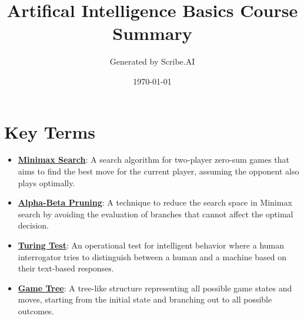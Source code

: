 \documentclass{article}%
\title{Artifical Intelligence Basics Course Summary}%
\author{Generated by Scribe.AI}%
\date{\today}%
\begin{document}
%
\normalsize%
\maketitle%
\section{Key Terms}%
\label{sec:KeyTerms}%
\begin{itemize}[leftmargin=*]%
\item \href{https://purdue.brightspace.com/d2l/common/assets/pdfjs-d2l-dist/1.0.14-legacy/web/viewer.html?file=\%2Fcontent\%2Fenforced\%2F1095467-wl.202510.CS.24300.001\%2F02L2-Intro.pdf\%3Fou\%3D1095467\&lang=en-us\&container=d2l-fileviewer-rendered-pdf\&fullscreen=d2l-fileviewer-rendered-pdf-dialog\&height=667#page=22}{\textbf{Minimax Search}}: A search algorithm for two-player zero-sum games that aims to find the best move for the current player, assuming the opponent also plays optimally.%
\item \href{https://purdue.brightspace.com/d2l/common/assets/pdfjs-d2l-dist/1.0.14-legacy/web/viewer.html?file=\%2Fcontent\%2Fenforced\%2F1095467-wl.202510.CS.24300.001\%2F02L2-Intro.pdf\%3Fou\%3D1095467\&lang=en-us\&container=d2l-fileviewer-rendered-pdf\&fullscreen=d2l-fileviewer-rendered-pdf-dialog\&height=667#page=23}{\textbf{Alpha{-}Beta Pruning}}: A technique to reduce the search space in Minimax search by avoiding the evaluation of branches that cannot affect the optimal decision.%
\item \href{https://purdue.brightspace.com/d2l/common/assets/pdfjs-d2l-dist/1.0.14-legacy/web/viewer.html?file=\%2Fcontent\%2Fenforced\%2F1095467-wl.202510.CS.24300.001\%2F02L2-Intro.pdf\%3Fou\%3D1095467\&lang=en-us\&container=d2l-fileviewer-rendered-pdf\&fullscreen=d2l-fileviewer-rendered-pdf-dialog\&height=667#page=6}{\textbf{Turing Test}}: An operational test for intelligent behavior where a human interrogator tries to distinguish between a human and a machine based on their text-based responses.%
\item \href{https://purdue.brightspace.com/d2l/common/assets/pdfjs-d2l-dist/1.0.14-legacy/web/viewer.html?file=\%2Fcontent\%2Fenforced\%2F1095467-wl.202510.CS.24300.001\%2F02L2-Intro.pdf\%3Fou\%3D1095467\&lang=en-us\&container=d2l-fileviewer-rendered-pdf\&fullscreen=d2l-fileviewer-rendered-pdf-dialog\&height=667#page=11}{\textbf{Game Tree}}: A tree-like structure representing all possible game states and moves, starting from the initial state and branching out to all possible outcomes.%

\end{itemize}
\end{document}
